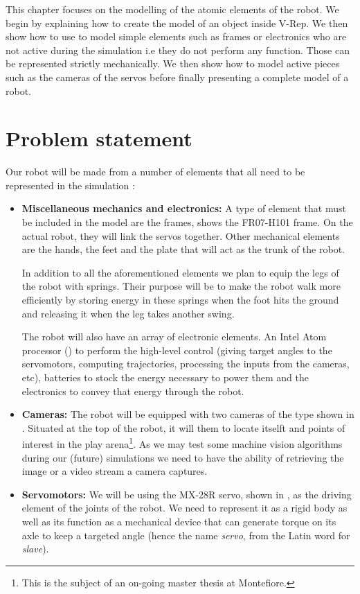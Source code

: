 This chapter focuses on the modelling of the atomic elements of the robot. We begin by explaining how to create the model of an object inside V-Rep. We then show how to use to model simple elements such as frames or electronics who are not active during the simulation i.e they do not perform any function. Those can be represented strictly mechanically. We then show how to model active pieces such as the cameras of the servos before finally presenting a complete model of a robot.

\section{Problem statement}
Our robot will be made from a number of elements that all need to be represented in the simulation :\begin{itemize}
\item \textbf{Miscellaneous mechanics and electronics:} A type of element that must be included in the model are the frames,  shows the FR07-H101 frame. On the actual robot, they will link the servos together. Other mechanical elements are the hands, the feet and the plate that will act as the trunk of the robot. 

In addition to all the aforementioned elements we plan to equip the legs of the robot with springs. Their purpose will be to make the robot walk more efficiently by storing energy in these springs when the foot hits the ground and releasing it when the leg takes another swing.

The robot will also have an array of electronic elements. An Intel Atom processor () to perform the high-level control (giving target angles to the servomotors, computing trajectories, processing the inputs from the cameras, etc),  batteries to stock the energy necessary to power them and the electronics to convey that energy through the robot.

\item \textbf{Cameras:} The robot will be equipped with two cameras of the type shown in . Situated at the top of the robot, it will them to locate itselft and points of interest in the play arena\footnote{This is the subject of an on-going master thesis at Montefiore.}. As we may test some machine vision algorithms during our (future) simulations we need to have the ability of retrieving the image or a video stream a camera captures.

\item \textbf{Servomotors:} We will be using the MX-28R servo, shown in , as the driving element of the joints of the robot. We need to represent it as a rigid body as well as its function as a mechanical device that can generate torque on its axle to keep a targeted angle (hence the name \emph{servo}, from the Latin word for \emph{slave}).
\end{itemize}

